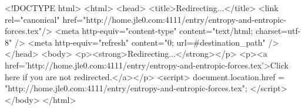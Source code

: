 <!DOCTYPE html>
<html>
<head>
<title>Redirecting...</title>
<link rel="canonical" href="http://home.jle0.com:4111/entry/entropy-and-entropic-forces.tex"/>
<meta http-equiv="content-type" content="text/html; charset=utf-8" />
<meta http-equiv="refresh" content="0; url=#{destination_path}" />
</head>
<body>
  <p><strong>Redirecting...</strong></p>
  <p><a href='http://home.jle0.com:4111/entry/entropy-and-entropic-forces.tex'>Click here if you are not redirected.</a></p>
  <script>
    document.location.href = "http://home.jle0.com:4111/entry/entropy-and-entropic-forces.tex";
  </script>
</body>
</html>
